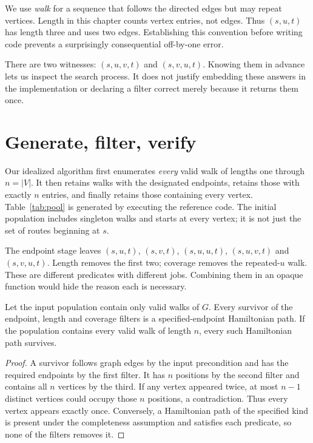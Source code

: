 We use \emph{walk} for a sequence that follows the directed edges but may
repeat vertices. Length in this chapter counts vertex entries, not edges.
Thus $(s,u,t)$ has length three and uses two edges. Establishing this convention
before writing code prevents a surprisingly consequential off-by-one error.

There are two witnesses: $(s,u,v,t)$ and $(s,v,u,t)$. Knowing them in advance
lets us inspect the search process. It does not justify embedding these
answers in the implementation or declaring a filter correct merely because
it returns them once.

\section{Generate, filter, verify}
Our idealized algorithm first enumerates \emph{every} valid walk of lengths one
through $n=|V|$. It then retains walks with the designated endpoints, retains
those with exactly $n$ entries, and finally retains those containing every
vertex. Table~\ref{tab:pool} is generated by executing the reference code.
The initial population includes singleton walks and starts at every vertex;
it is not just the set of routes beginning at $s$.

\begin{table}[htbp]
\centering

\caption{Exact token counts for the declared four-vertex graph. Counts refer
to distinct enumerated walks, not DNA molecules or experimental yields.}
\label{tab:pool}
\end{table}

The endpoint stage leaves $(s,u,t)$, $(s,v,t)$, $(s,u,u,t)$,
$(s,u,v,t)$ and $(s,v,u,t)$. Length removes the first two; coverage removes the
repeated-$u$ walk. These are different predicates with different jobs. Combining
them in an opaque function would hide the reason each is necessary.

\begin{proposition}
Let the input population contain only valid walks of $G$. Every survivor of
the endpoint, length and coverage filters is a specified-endpoint Hamiltonian
path. If the population contains every valid walk of length $n$, every such
Hamiltonian path survives.
\end{proposition}
\begin{proof}
A survivor follows graph edges by the input precondition and has the required
endpoints by the first filter. It has $n$ positions by the second filter and
contains all $n$ vertices by the third. If any vertex appeared twice, at most
$n-1$ distinct vertices could occupy those $n$ positions, a contradiction.
Thus every vertex appears exactly once. Conversely, a Hamiltonian path of the
specified kind is present under the completeness assumption and satisfies
each predicate, so none of the filters removes it.
\end{proof}

